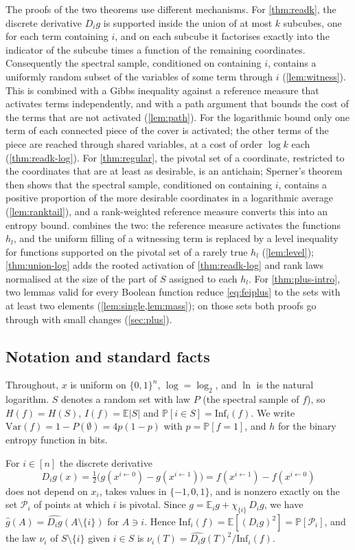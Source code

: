 \documentclass[11pt]{amsart}
\theoremstyle{definition}
\theoremstyle{remark}
\newcommand{\E}{\mathbb{E}}
\renewcommand{\Pr}{\mathbb{P}}
\newcommand{\Inf}{\mathrm{Inf}}
\newcommand{\Var}{\mathrm{Var}}
\newcommand{\hatg}{\widehat{g}}
\newcommand{\bits}{\{0,1\}}
\begin{document}
The proofs of the two theorems use different mechanisms. For
\cref{thm:readk}, the discrete derivative $D_ig$ is supported inside the union of at most $k$ subcubes, one for each
term containing $i$, and on each subcube it factorises exactly into the indicator of the subcube times a function
of the remaining coordinates. Consequently the spectral sample, conditioned on containing $i$, contains a uniformly
random subset of the variables of some term through $i$ (\cref{lem:witness}). This is combined with a Gibbs
inequality against a reference measure that activates terms independently, and with a path argument that bounds
the cost of the terms that are not activated (\cref{lem:path}). For the logarithmic bound only one term of each
connected piece of the cover is activated; the other terms of the piece are reached through shared variables, at a
cost of order $\log k$ each (\cref{thm:readk-log}). For \cref{thm:regular}, the pivotal set of a
coordinate, restricted to the coordinates that are at least as desirable, is an antichain; Sperner's theorem then
shows that the spectral sample, conditioned on containing $i$, contains a positive proportion of the more desirable
coordinates in a logarithmic average (\cref{lem:ranktail}), and a rank-weighted reference measure converts this into
an entropy bound.  combines the two: the reference measure activates the functions $h_l$, and the
uniform filling of a witnessing term is replaced by a level inequality for functions supported on the pivotal set
of a rarely true $h_l$ (\cref{lem:level}); \cref{thm:union-log} adds the rooted activation of \cref{thm:readk-log}
and rank laws normalised at the size of the part of $S$ assigned to each $h_l$. For \cref{thm:plus-intro}, two lemmas valid for every Boolean function reduce
\eqref{eq:feiplus} to the sets with at least two elements (\cref{lem:single,lem:mass}); on those sets both proofs
go through with small changes (\cref{sec:plus}).

\subsection*{Notation and standard facts}
Throughout, $x$ is uniform on $\bits^n$, $\log=\log_2$, and $\ln$ is the natural logarithm. $S$ denotes a random set
with law $P$ (the spectral sample of $f$), so $H(f)=H(S)$, $I(f)=\E|S|$ and $\Pr[i\in S]=\Inf_i(f)$. We write
$\Var(f)=1-P(\emptyset)=4p(1-p)$ with $p=\Pr[f=1]$, and $h$ for the binary entropy function in bits.

For $i\in[n]$ the discrete derivative
\[
D_ig(x)=\tfrac12\bigl(g(x^{i\leftarrow0})-g(x^{i\leftarrow1})\bigr)=f(x^{i\leftarrow1})-f(x^{i\leftarrow0})
\]
does not depend on $x_i$, takes values in $\{-1,0,1\}$, and is nonzero exactly on the set $\mathcal P_i$ of points
at which $i$ is pivotal. Since $g=\E_ig+\chi_{\{i\}}\,D_ig$, we have $\hatg(A)=\widehat{D_ig}(A\setminus\{i\})$ for
$A\ni i$. Hence $\Inf_i(f)=\E[(D_ig)^2]=\Pr[\mathcal P_i]$, and the law $\nu_i$ of $S\setminus\{i\}$ given $i\in S$
is $\nu_i(T)=\widehat{D_ig}(T)^2/\Inf_i(f)$.
\end{document}
